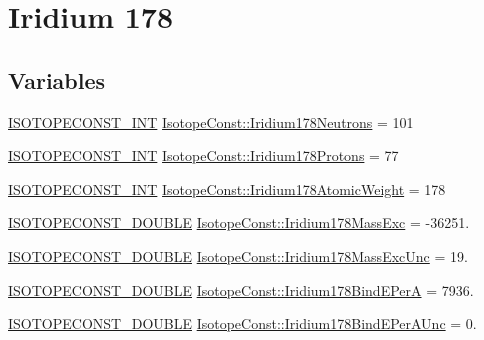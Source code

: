 \hypertarget{group___isotope_const-_iridium-_ir178}{}\section{Iridium 178}
\label{group___isotope_const-_iridium-_ir178}
\subsection*{Variables}
\begin{DoxyCompactItemize}
\item 
\mbox{\hyperlink{group___isotope_const-_macros_ga5f18360b3e99483a35c32d789e62621c}{I\+S\+O\+T\+O\+P\+E\+C\+O\+N\+S\+T\+\_\+\+I\+NT}} \mbox{\hyperlink{group___isotope_const-_iridium-_ir178_gae1348a4e98becc9b5d162083326c8e88}{Isotope\+Const\+::\+Iridium178\+Neutrons}} = 101
\item 
\mbox{\hyperlink{group___isotope_const-_macros_ga5f18360b3e99483a35c32d789e62621c}{I\+S\+O\+T\+O\+P\+E\+C\+O\+N\+S\+T\+\_\+\+I\+NT}} \mbox{\hyperlink{group___isotope_const-_iridium-_ir178_gad3e12407cd894127aaf9864c94b20f18}{Isotope\+Const\+::\+Iridium178\+Protons}} = 77
\item 
\mbox{\hyperlink{group___isotope_const-_macros_ga5f18360b3e99483a35c32d789e62621c}{I\+S\+O\+T\+O\+P\+E\+C\+O\+N\+S\+T\+\_\+\+I\+NT}} \mbox{\hyperlink{group___isotope_const-_iridium-_ir178_gacd8e5519b251a31e671e1d3b9e384975}{Isotope\+Const\+::\+Iridium178\+Atomic\+Weight}} = 178
\item 
\mbox{\hyperlink{group___isotope_const-_macros_ga8f45a7272ce02c0b4c65c44636ed719a}{I\+S\+O\+T\+O\+P\+E\+C\+O\+N\+S\+T\+\_\+\+D\+O\+U\+B\+LE}} \mbox{\hyperlink{group___isotope_const-_iridium-_ir178_gac29b1807e5d68decaae387aad3c5928b}{Isotope\+Const\+::\+Iridium178\+Mass\+Exc}} = -\/36251.
\item 
\mbox{\hyperlink{group___isotope_const-_macros_ga8f45a7272ce02c0b4c65c44636ed719a}{I\+S\+O\+T\+O\+P\+E\+C\+O\+N\+S\+T\+\_\+\+D\+O\+U\+B\+LE}} \mbox{\hyperlink{group___isotope_const-_iridium-_ir178_gafbd05a2ee54369f51c2c515425eeb948}{Isotope\+Const\+::\+Iridium178\+Mass\+Exc\+Unc}} = 19.
\item 
\mbox{\hyperlink{group___isotope_const-_macros_ga8f45a7272ce02c0b4c65c44636ed719a}{I\+S\+O\+T\+O\+P\+E\+C\+O\+N\+S\+T\+\_\+\+D\+O\+U\+B\+LE}} \mbox{\hyperlink{group___isotope_const-_iridium-_ir178_ga4668c0ea5ecea06c9439b2e37ae3a3dc}{Isotope\+Const\+::\+Iridium178\+Bind\+E\+PerA}} = 7936.
\item 
\mbox{\hyperlink{group___isotope_const-_macros_ga8f45a7272ce02c0b4c65c44636ed719a}{I\+S\+O\+T\+O\+P\+E\+C\+O\+N\+S\+T\+\_\+\+D\+O\+U\+B\+LE}} \mbox{\hyperlink{group___isotope_const-_iridium-_ir178_ga5fe39a932581f25696ad7eca813b0157}{Isotope\+Const\+::\+Iridium178\+Bind\+E\+Per\+A\+Unc}} = 0.

\end{DoxyCompactItemize}
